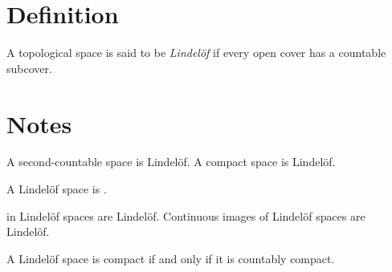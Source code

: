 \documentclass{article}
\begin{document}
\section*{Definition}

A topological space is said to be \emph{Lindel\"of} if every open cover has a countable subcover.

\section*{Notes}

A second-countable space is Lindel\"of.
A compact space is Lindel\"of.

A  Lindel\"of space is .

 in Lindel\"of spaces are Lindel\"of.
Continuous images of Lindel\"of spaces are Lindel\"of.

A Lindel\"of space is compact if and only if it is countably compact.
\end{document}
